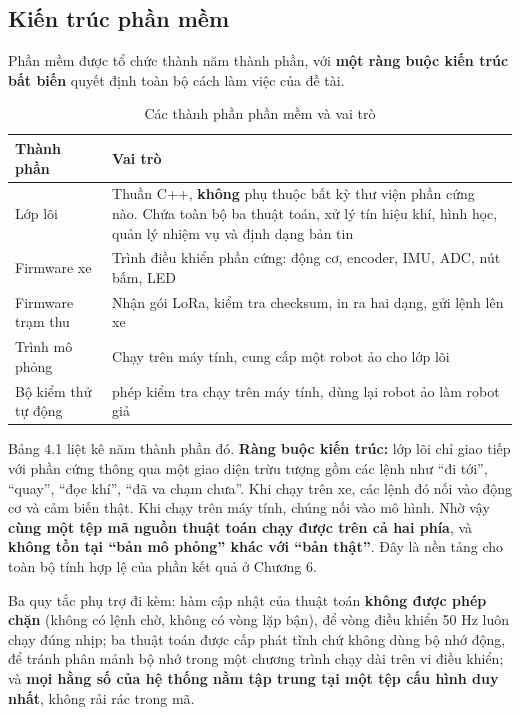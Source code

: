 \subsection{Kiến trúc phần mềm}
Phần mềm được tổ chức thành năm thành phần, với \textbf{một ràng buộc kiến trúc bất biến} quyết định toàn bộ cách làm việc của đề tài.

\begin{table}[!htbp]
  \centering
  \caption{Các thành phần phần mềm và vai trò}
  \small
  \renewcommand{\arraystretch}{1.25}
  \begin{tabular}{>{\raggedright\arraybackslash}p{}>{\raggedright\arraybackslash}p{}}
    \toprule
    \textbf{Thành phần} & \textbf{Vai trò} \\
    \midrule
    Lớp lõi & Thuần C++, \textbf{không} phụ thuộc bất kỳ thư viện phần cứng nào. Chứa toàn bộ ba thuật toán, xử lý tín hiệu khí, hình học, quản lý nhiệm vụ và định dạng bản tin \\
    Firmware xe & Trình điều khiển phần cứng: động cơ, encoder, IMU, ADC, nút bấm, LED \\
    Firmware trạm thu & Nhận gói LoRa, kiểm tra checksum, in ra hai dạng, gửi lệnh lên xe \\
    Trình mô phỏng & Chạy trên máy tính, cung cấp một robot ảo cho lớp lõi \\
    Bộ kiểm thử tự động & 86 phép kiểm tra chạy trên máy tính, dùng lại robot ảo làm robot giả \\
    \bottomrule
  \end{tabular}
\end{table}
Bảng 4.1 liệt kê năm thành phần đó. \textbf{Ràng buộc kiến trúc:} lớp lõi chỉ giao tiếp với phần cứng thông qua một giao diện trừu tượng gồm các lệnh như ``đi tới'', ``quay'', ``đọc khí'', ``đã va chạm chưa''. Khi chạy trên xe, các lệnh đó nối vào động cơ và cảm biến thật. Khi chạy trên máy tính, chúng nối vào mô hình. Nhờ vậy \textbf{cùng một tệp mã nguồn thuật toán chạy được trên cả hai phía}, và \textbf{không tồn tại ``bản mô phỏng'' khác với ``bản thật''}. Đây là nền tảng cho toàn bộ tính hợp lệ của phần kết quả ở Chương 6.

Ba quy tắc phụ trợ đi kèm: hàm cập nhật của thuật toán \textbf{không được phép chặn} (không có lệnh chờ, không có vòng lặp bận), để vòng điều khiển 50 Hz luôn chạy đúng nhịp; ba thuật toán được cấp phát tĩnh chứ không dùng bộ nhớ động, để tránh phân mảnh bộ nhớ trong một chương trình chạy dài trên vi điều khiển; và \textbf{mọi hằng số của hệ thống nằm tập trung tại một tệp cấu hình duy nhất}, không rải rác trong mã.

